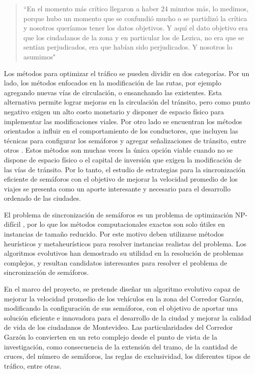 \begin{quote}\small
	``En el momento más crítico llegaron a haber 24 minutos más, lo medimos, porque hubo un momento que se confundió mucho o se partidizó la crítica y nosotros queríamos tener los datos objetivos. Y aquí el dato objetivo era que los ciudadanos de la zona y en particular los de Lezica, no era que se sentían perjudicados, era que habían sido perjudicados. Y nosotros lo asumimos"
\end{quote}

Los métodos para optimizar el tráfico se pueden dividir en dos categorías. Por un lado, los métodos enfocados en la modificación de las rutas, por ejemplo agregando nuevas vías de circulación, o ensanchando las existentes. Esta alternativa permite lograr mejoras en la circulación del tránsito, pero como punto negativo exigen un alto costo monetario \citep{litman2009transportation} y disponer de espacio físico para implementar las modificaciones viales. Por otro lado se encuentran los métodos orientados a influir en el comportamiento de los conductores, que incluyen las técnicas para configurar los semáforos y agregar señalizaciones de tránsito, entre otros \citep{mckenney2013distributed}. Estos métodos son muchas veces la única opción viable cuando no se dispone de espacio físico o el capital de inversión que exigen la modificación de las vías de tránsito. Por lo tanto, el estudio de estrategias para la sincronización eficiente de semáforos con el objetivo de mejorar la velocidad promedio de los viajes se presenta como un aporte interesante y necesario para el desarrollo ordenado de las ciudades. 

El problema de sincronización de semáforos es un problema de optimización NP-difícil \citep{yang1996model}, por lo que los métodos computacionales exactos son solo útiles en instancias de tamaño reducido. Por este motivo deben utilizarse métodos heurísticos y metaheurísticos para resolver instancias realistas del problema. Los algoritmos evolutivos han demostrado su utilidad en la resolución de problemas complejos, y resultan candidatos interesantes para resolver el problema de sincronización de semáforos. 

En el marco del proyecto, se pretende diseñar un algoritmo evolutivo capaz de mejorar la velocidad promedio de los vehículos en la zona del Corredor Garzón, modificando la configuración de sus semáforos, con el objetivo de aportar una solución eficiente e innovadora para el desarrollo de la ciudad y mejorar la calidad de vida de los ciudadanos de Montevideo. Las particularidades del Corredor Garzón lo convierten en un reto complejo desde el punto de vista de la investigación, como consecuencia de la extensión del tramo, de la cantidad de cruces, del número de semáforos, las reglas de exclusividad, los diferentes tipos de tráfico, entre otras.



